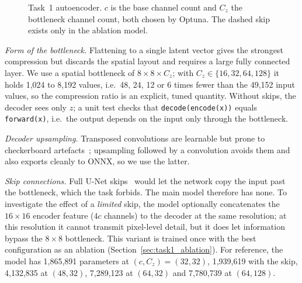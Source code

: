 \documentclass[conference]{IEEEtran}
\begin{document}
\begin{figure}[t]
\centering

\caption{Task~1 autoencoder. $c$ is the base channel count and $C_z$ the
bottleneck channel count, both chosen by Optuna. The dashed skip exists only
in the ablation model.}
\label{fig:task1_arch}
\end{figure}

\emph{Form of the bottleneck.} Flattening to a single latent vector gives
the strongest compression but discards the spatial layout and requires a
large fully connected layer. We use a spatial bottleneck of $8\times8\times
C_z$; with $C_z\in\{16,32,64,128\}$ it holds 1,024 to 8,192 values, i.e.\
48, 24, 12 or 6 times fewer than the 49,152 input values, so the compression
ratio is an explicit, tuned quantity. Without skips, the decoder sees only
$z$; a unit test checks that \texttt{decode(encode(x))} equals
\texttt{forward(x)}, i.e.\ the output depends on the input only through the
bottleneck.

\emph{Decoder upsampling.} Transposed convolutions are learnable but prone
to checkerboard artefacts~\cite{odena2016deconvolution}; upsampling followed
by a convolution avoids them and also exports cleanly to ONNX, so we use the
latter.

\emph{Skip connections.} Full U-Net skips~\cite{ronneberger2015unet} would
let the network copy the input past the bottleneck, which the task forbids.
The main model therefore has none. To investigate the effect of a
\emph{limited} skip, the model optionally concatenates the $16\times16$
encoder feature ($4c$ channels) to the decoder at the same resolution; at
this resolution it cannot transmit pixel-level detail, but it does let
information bypass the $8\times8$ bottleneck. This variant is trained once
with the best configuration as an ablation (Section~\ref{sec:task1_ablation}).
For reference, the model has 1,865,891 parameters at $(c, C_z)=(32,32)$,
1,939,619 with the skip, 4,132,835 at $(48,32)$, 7,289,123 at $(64,32)$ and
7,780,739 at $(64,128)$.
\end{document}
